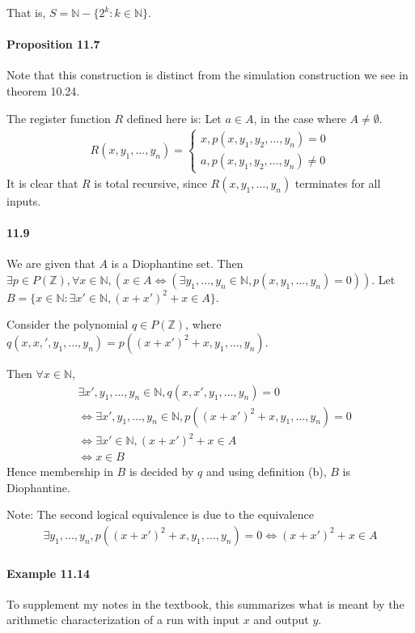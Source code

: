 \documentclass{article}
\begin{document}
That is, $S=\mathbb{N}-\{2^k:k\in \mathbb{N}\}$.


\paragraph{Proposition 11.7} Note that this construction is distinct from the simulation construction we see in theorem 10.24.

The register function $R$ defined here is: Let $a\in A$, in the case where $A\neq \emptyset$.
\begin{align*}
R(x, y_1,\dots, y_n) =
\begin{cases}
x, p(x,y_1,y_2,\dots,y_n) = 0\\
a, p(x,y_1,y_2,\dots,y_n) \neq 0
\end{cases}
\end{align*}
It is clear that $R$ is total recursive, since $R(x, y_1,\dots, y_n)$ terminates for all inputs.


\paragraph{11.9} We are given that $A$ is a Diophantine set. Then $\exists p\in P(\mathbb{Z}), \forall x\in \mathbb{N}, (x\in A \iff (\exists y_1,\dots,y_n\in \mathbb{N}, p(x,y_1,\dots, y_n) = 0))$. Let $B=\{x\in \mathbb{N} : \exists x'\in \mathbb{N}, (x+x')^2+x\in A\}$.

Consider the polynomial $q\in P(\mathbb{Z})$, where $q(x,x,',y_1,\dots,y_n) = p((x+x')^2+x,y_1,\dots,y_n)$.

Then $\forall x\in \mathbb{N}$,
\begin{align*}
	&\exists x',y_1,\dots,y_n\in \mathbb{N}, q(x,x',y_1,\dots,y_n)=0\\
	&\iff \exists x',y_1,\dots,y_n\in \mathbb{N}, p((x+x')^2+x,y_1,\dots,y_n)=0\\
	&\iff \exists x'\in \mathbb{N}, (x+x')^2+x\in A\\
	&\iff x\in B
\end{align*}
Hence membership in $B$ is decided by $q$ and using definition (b), $B$ is Diophantine.

Note: The second logical equivalence is due to the equivalence
\begin{align*}
	\exists y_1,\dots,y_n, p((x+x')^2+x,y_1,\dots,y_n)=0 \iff (x+x')^2+x\in A
\end{align*}

\paragraph{Example 11.14} To supplement my notes in the textbook, this summarizes what is meant by the arithmetic characterization of a run with input $x$ and output $y$.
\end{document}
